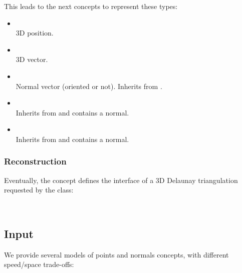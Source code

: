 This leads to the next concepts to represent these types:

\begin{itemize}
\item {} \\
3D position.
\item {} \\
3D vector.
\item {} \\
Normal vector (oriented or not). Inherits from .
\item {} \\
Inherits from  and contains a  normal.
\item {} \\
Inherits from  and contains a  normal.
\end{itemize}

\subsubsection{Reconstruction}

Eventually, the  concept defines the interface of a 3D Delaunay triangulation requested by the  class:

  \\


\subsection{Input}

We provide several models of points and normals concepts, with different speed/space trade-offs:

